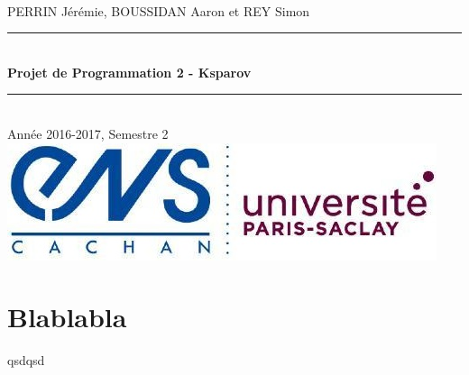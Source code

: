 \documentclass[a4paper]{article}
\newcommand{\HRule}{\rule{\linewidth}{0.5mm}}
\begin{document}
\begin{titlepage}
~\\
PERRIN Jérémie, BOUSSIDAN Aaron et REY Simon\\[5cm]
\begin{center}
\HRule 
\\[0.4cm]{\huge\bfseries Projet de Programmation 2 - Ksparov\\[0.4cm]}
\HRule \\[0.5cm] 
Année 2016-2017, Semestre 2\\[12cm]
\includegraphics[scale=0.7]{Images/Logo_ENS_PS.jpg}
\end{center}
\end{titlepage}
\tableofcontents

\newpage

\section{Blablabla}

qsdqsd
\end{document}
